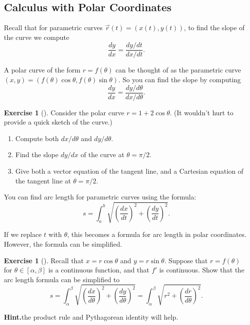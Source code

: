 \documentclass[10pt,]{book}
\theoremstyle{plain}
\theoremstyle{definition}
\theoremstyle{definition}
\theoremstyle{definition}
\theoremstyle{definition}
\newtheorem{exploration}[project]{Exercise}
\theoremstyle{definition}
\numberwithin{equation}{section}
\begin{document}
\subsection[{Calculus with Polar Coordinates}]{Calculus with Polar Coordinates}\label{subsection-21}
Recall that for parametric curves \(\vec r(t) = (x(t),y(t))\), to find the slope of the curve we compute%
\begin{equation*}
\frac{dy}{dx}=\frac{dy/dt}{dx/dt}.
\end{equation*}
%
\par
A polar curve of the form \(r=f(\theta)\) can be thought of as the parametric curve \((x,y) = (f(\theta)\cos\theta,f(\theta)\sin\theta)\). So you can find the slope by computing%
\begin{equation*}
\frac{dy}{dx}=\frac{dy/d\theta}{dx/d\theta}.
\end{equation*}
%
\begin{exploration}[]\label{exploration-95}
Consider the polar curve \(r=1+2\cos \theta\). (It wouldn't hurt to provide a quick sketch of the curve.)%
\begin{enumerate}[font=\bfseries,label=(\alph*),ref=\alph*]
\item\label{task-155} Compute both \(dx/d\theta\) and \(dy/d\theta\).%
\item\label{task-156} Find the slope \(dy/dx\) of the curve at \(\theta=\pi/2\).%
\item\label{task-157} Give both a vector equation of the tangent line, and a Cartesian equation of the tangent line at \(\theta=\pi/2\).%
\end{enumerate}
\end{exploration}
You can find arc length for parametric curves using the formula:%
\begin{equation*}
s=\int_a^b\sqrt{\left(\frac{dx}{dt}\right)^2+\left(\frac{dy}{dt}\right)^2}.
\end{equation*}
%
\par
If we replace \(t\) with \(\theta\), this becomes a formula for arc length in polar coordinates. However, the formula can be simplified.%
\begin{exploration}[]\label{exploration-96}
Recall that \(x=r\cos\theta\) and \(y=r\sin\theta\). Suppose that \(r=f(\theta)\) for \(\theta\in[\alpha,\beta]\) is a continuous function, and that \(f'\) is continuous. Show that the arc length formula can be simplified to%
\begin{equation*}
s=\int_{\alpha}^{\beta}\sqrt{\left(\frac{dx}{d\theta}\right)^2+\left(\frac{dy}{d\theta}\right)^2} 
= \int_{\alpha}^{\beta}\sqrt{r^2+\left(\frac{dr}{d\theta}\right)^2} .
\end{equation*}
%
\par\medskip\noindent%
\textbf{Hint.}\quad the product rule and Pythagorean identity will help.%
\end{exploration}
\end{document}
